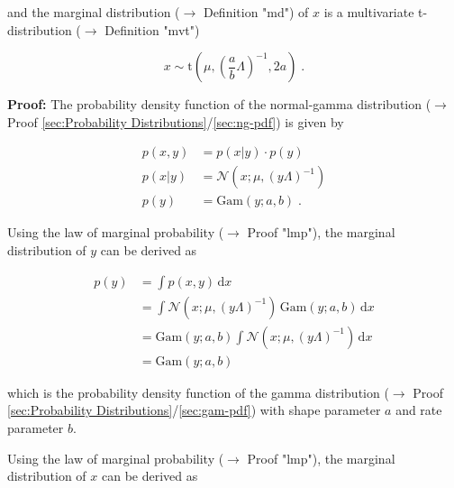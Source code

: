 \documentclass[a4paper,12pt]{book}
\begin{document}
and the marginal distribution ($\rightarrow$ Definition "md") of $x$ is a multivariate t-distribution ($\rightarrow$ Definition "mvt")

\begin{equation} \label{eq:ng-marg-ng-marg-x}
x \sim \mathrm{t}\left( \mu, \left(\frac{a}{b} \Lambda \right)^{-1}, 2a \right) \; .
\end{equation}


\vspace{1em}
\textbf{Proof:} The probability density function of the normal-gamma distribution ($\rightarrow$ Proof \ref{sec:Probability Distributions}/\ref{sec:ng-pdf}) is given by

\begin{equation} \label{eq:ng-marg-ng-pdf}
\begin{split}
p(x,y) &= p(x|y) \cdot p(y) \\
p(x|y) &= \mathcal{N}(x; \mu, (y \Lambda)^{-1}) \\
p(y) &= \mathrm{Gam}(y; a, b) \; .
\end{split}
\end{equation}

\vspace{1em}
Using the law of marginal probability ($\rightarrow$ Proof "lmp"), the marginal distribution of $y$ can be derived as

\begin{equation} \label{eq:ng-marg-ng-marg-y-qed}
\begin{split}
p(y) &= \int p(x,y) \, \mathrm{d}x \\
&= \int \mathcal{N}(x; \mu, (y \Lambda)^{-1}) \, \mathrm{Gam}(y; a, b) \, \mathrm{d}x \\
&= \mathrm{Gam}(y; a, b) \int \mathcal{N}(x; \mu, (y \Lambda)^{-1}) \, \mathrm{d}x \\
&= \mathrm{Gam}(y; a, b)
\end{split}
\end{equation}

which is the probability density function of the gamma distribution ($\rightarrow$ Proof \ref{sec:Probability Distributions}/\ref{sec:gam-pdf}) with shape parameter $a$ and rate parameter $b$.

\vspace{1em}
Using the law of marginal probability ($\rightarrow$ Proof "lmp"), the marginal distribution of $x$ can be derived as
\end{document}
